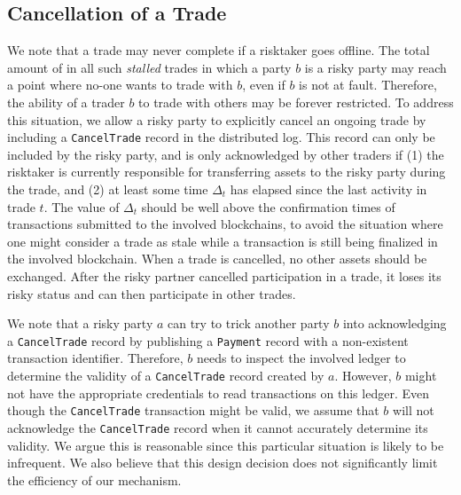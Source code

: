 

\subsection{Cancellation of a Trade}
\label{sec:trade-cancellation}
We note that a trade may never complete if a risktaker goes offline.
The total amount of \MarginalStake{} in all such \emph{stalled} trades in which a party $ b $ is a risky party may reach a point where no-one wants to trade with $ b $, even if $ b $ is not at fault.
Therefore, the ability of a trader $ b $ to trade with others may be forever restricted.
To address this situation, we allow a risky party to explicitly cancel an ongoing trade by including a \texttt{CancelTrade} record in the distributed log.
This record can only be included by the risky party, and is only acknowledged by other traders if (1) the risktaker is currently responsible for transferring assets to the risky party during the trade, and (2) at least some time $ \Delta_t $ has elapsed since the last activity in trade $ t $.
The value of $ \Delta_t $ should be well above the confirmation times of transactions submitted to the involved blockchains, to avoid the situation where one might consider a trade as stale while a transaction is still being finalized in the involved blockchain.
When a trade is cancelled, no other assets should be exchanged.
After the risky partner cancelled participation in a trade, it loses its risky status and can then participate in other trades.

We note that a risky party $ a $ can try to trick another party $ b $ into acknowledging a \texttt{CancelTrade} record by publishing a \texttt{Payment} record with a non-existent transaction identifier.
Therefore, $ b $ needs to inspect the involved ledger to determine the validity of a \texttt{CancelTrade} record created by $ a $.
However, $ b $ might not have the appropriate credentials to read transactions on this ledger.
Even though the \texttt{CancelTrade} transaction might be valid, we assume that $ b $ will not acknowledge the \texttt{CancelTrade} record when it cannot accurately determine its validity.
We argue this is reasonable since this particular situation is likely to be infrequent.
We also believe that this design decision does not significantly limit the efficiency of our mechanism.

